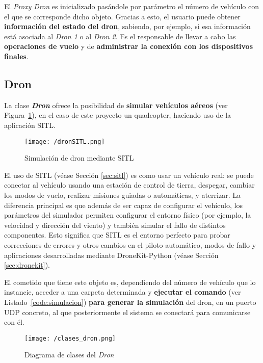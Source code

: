 El \textit{Proxy Dron} es inicializado pasándole por parámetro el número de vehículo con el que se corresponde dicho objeto. Gracias a esto, el usuario puede obtener \textbf{información del estado del dron}, sabiendo, por ejemplo, si esa información está asociada al \textit{Dron 1} o al \textit{Dron 2}. Es el responsable de llevar a cabo las \textbf{operaciones de vuelo} y de \textbf{administrar la conexión con los dispositivos finales}.

\subsection{Dron}
\label{sec:dron}

La clase \textbf{\textit{Dron}} ofrece la posibilidad de \textbf{simular vehículos aéreos} (ver Figura~\ref{fig:dronSITL}), en el caso de este proyecto un quadcopter, haciendo uso de la aplicación \acs{SITL}.

\begin{figure}[!h]
\begin{center}
\texttt{[image: /dronSITL.png]}
\caption[Simulación de dron mediante \acs{SITL}]{Simulación de dron mediante \acs{SITL}}
\label{fig:dronSITL}
\end{center}
\end{figure}

El uso de \acs{SITL} (véase Sección \ref{sec:sitl}) es como usar un vehículo real: se puede conectar al vehículo usando una estación de control de tierra, despegar, cambiar los modos de vuelo, realizar misiones guiadas o automáticas, y aterrizar. La diferencia principal es que además de ser capaz de configurar el vehículo, los parámetros del simulador permiten configurar el entorno físico (por ejemplo, la velocidad y dirección del viento) y también simular el fallo de distintos componentes. Esto significa que \acs{SITL} es el entorno perfecto para probar correcciones de errores y otros cambios en el piloto automático, modos de fallo y aplicaciones desarrolladas mediante DroneKit-Python (véase Sección \ref{sec:dronekit}).

El cometido que tiene este objeto es, dependiendo del número de vehículo que lo instancie, acceder a una carpeta determinada y \textbf{ejecutar el comando} (ver Listado~\ref{code:simulacion}) \textbf{para generar la simulación} del dron, en un puerto UDP concreto, al que posteriormente el sistema se conectará para comunicarse con él.

\begin{figure}[!h]
\begin{center}
\texttt{[image: /clases\_dron.png]}
\caption[Diagrama de clases del \textit{Dron}]{Diagrama de clases del \textit{Dron}}
\label{fig:diagclasesdron}
\end{center}
\end{figure}

